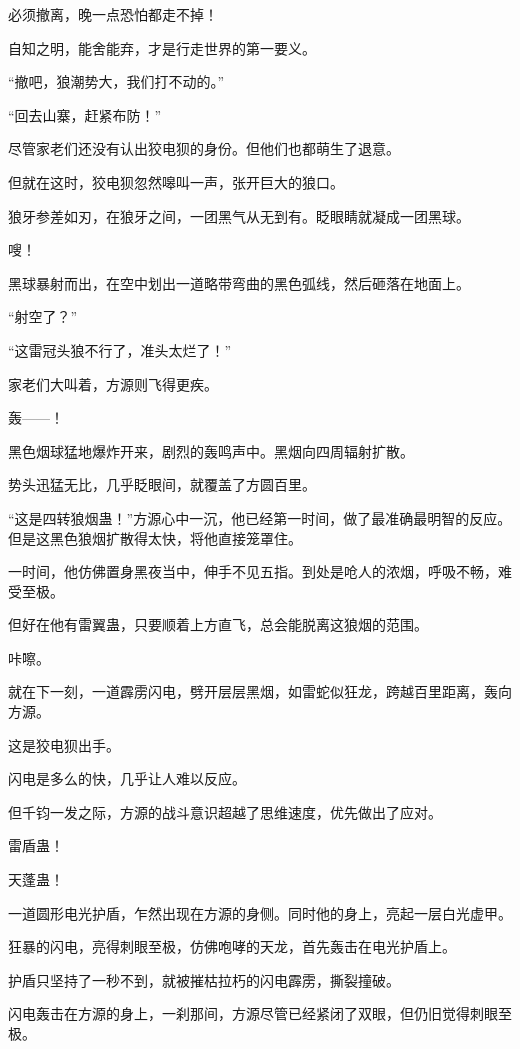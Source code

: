 \begin{this_body}
必须撤离，晚一点恐怕都走不掉！

自知之明，能舍能弃，才是行走世界的第一要义。

“撤吧，狼潮势大，我们打不动的。”

“回去山寨，赶紧布防！”

尽管家老们还没有认出狡电狈的身份。但他们也都萌生了退意。

但就在这时，狡电狈忽然嗥叫一声，张开巨大的狼口。

狼牙参差如刃，在狼牙之间，一团黑气从无到有。眨眼睛就凝成一团黑球。

嗖！

黑球暴射而出，在空中划出一道略带弯曲的黑色弧线，然后砸落在地面上。

“射空了？”

“这雷冠头狼不行了，准头太烂了！”

家老们大叫着，方源则飞得更疾。

轰——！

黑色烟球猛地爆炸开来，剧烈的轰鸣声中。黑烟向四周辐射扩散。

势头迅猛无比，几乎眨眼间，就覆盖了方圆百里。

“这是四转狼烟蛊！”方源心中一沉，他已经第一时间，做了最准确最明智的反应。但是这黑色狼烟扩散得太快，将他直接笼罩住。

一时间，他仿佛置身黑夜当中，伸手不见五指。到处是呛人的浓烟，呼吸不畅，难受至极。

但好在他有雷翼蛊，只要顺着上方直飞，总会能脱离这狼烟的范围。

咔嚓。

就在下一刻，一道霹雳闪电，劈开层层黑烟，如雷蛇似狂龙，跨越百里距离，轰向方源。

这是狡电狈出手。

闪电是多么的快，几乎让人难以反应。

但千钧一发之际，方源的战斗意识超越了思维速度，优先做出了应对。

雷盾蛊！

天蓬蛊！

一道圆形电光护盾，乍然出现在方源的身侧。同时他的身上，亮起一层白光虚甲。

狂暴的闪电，亮得刺眼至极，仿佛咆哮的天龙，首先轰击在电光护盾上。

护盾只坚持了一秒不到，就被摧枯拉朽的闪电霹雳，撕裂撞破。

闪电轰击在方源的身上，一刹那间，方源尽管已经紧闭了双眼，但仍旧觉得刺眼至极。


\end{this_body}
